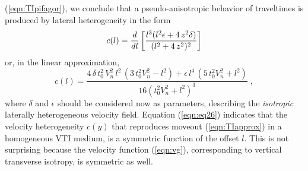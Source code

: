 (\ref{eqn:TIpifagor}), we conclude that a pseudo-anisotropic behavior of
traveltimes is produced by lateral heterogeneity in the form
\begin{equation}
   c(l) = { d \over {d l}} 
             \left[{ {l^3 (l^2 \epsilon + 4\,z^2 \delta )} \over 
                      {(l^2 + 4\,z^2)^2} } \right]
\label{eqn:eq25}
\end{equation}
or, in the linear approximation,
\begin{equation}
c(l) = \frac{4 \, \delta\,t_0^2\,V_n^2\,l^2\,(3 \, t_0^2 V_n^2 - l^2) 
             + \epsilon\,l^4\,(5 \, t_0^2 V_n^2 + l^2)} 
            {16 \left(t_0^2 V_n^2 + l^2 \right)^3} \;,
\label{eqn:eq26}
\end{equation}
where $\delta$ and $\epsilon$ should be considered now as 
parameters, describing the {\em isotropic}$\,$ laterally heterogeneous velocity
field.  Equation (\ref{eqn:eq26}) indicates that the velocity heterogeneity
$c(y)$ that reproduces moveout (\ref{eqn:TIapprox}) in a homogeneous VTI medium,
is a symmetric function of the offset $l$. This is not surprising
because the velocity function (\ref{eqn:vg}), corresponding to vertical
transverse isotropy, is symmetric as well.
